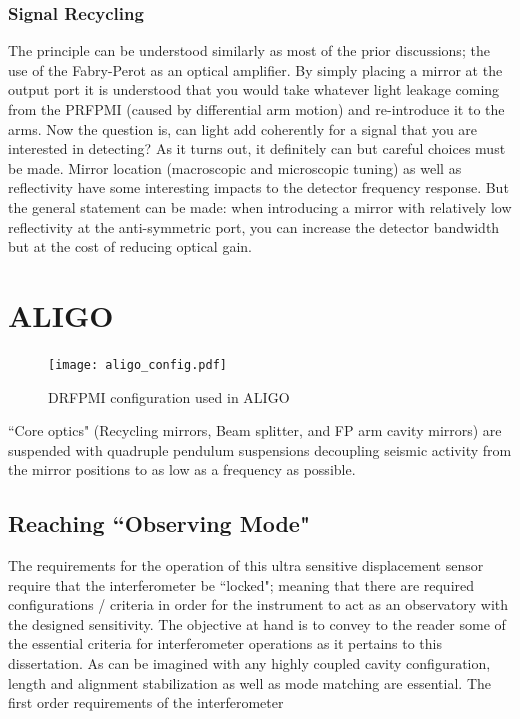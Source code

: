 \subsubsection{Signal Recycling}
The principle can be understood similarly as most of the prior discussions; the use of the Fabry-Perot as an optical amplifier. By simply placing a mirror at the output port it is understood that you would take whatever light leakage coming from the PRFPMI (caused by differential arm motion) and re-introduce it to the arms. Now the question is, can light add coherently for a signal that you are interested in detecting? As it turns out, it definitely can but careful choices must be made. Mirror location (macroscopic and microscopic tuning) as well as reflectivity have some interesting impacts to the detector frequency response. But the general statement can be made: when introducing a mirror with relatively low reflectivity at the anti-symmetric port, you can increase the detector bandwidth but at the cost of reducing optical gain.


\section{ALIGO}

\begin{figure}[H]
  \begin{center}
	  \texttt{[image: aligo\_config.pdf]}
  \end{center}
  \caption{DRFPMI configuration used in ALIGO}
  \label{fig:simple_michelson}
\end{figure}

``Core optics" (Recycling mirrors, Beam splitter, and FP arm cavity mirrors) are suspended with quadruple pendulum suspensions decoupling seismic activity from the mirror positions to as low as a frequency as possible. 

\subsection{Reaching ``Observing Mode"}
The requirements for the operation of this ultra sensitive displacement sensor require that the interferometer be  ``locked"; meaning that there are required configurations / criteria in order for the instrument to act as an observatory with the designed sensitivity. The objective at hand is to convey to the reader some of the essential criteria for interferometer operations as it pertains to this dissertation. As can be imagined with any highly coupled cavity configuration, length and alignment stabilization as well as mode matching are essential. The first order requirements of the interferometer

